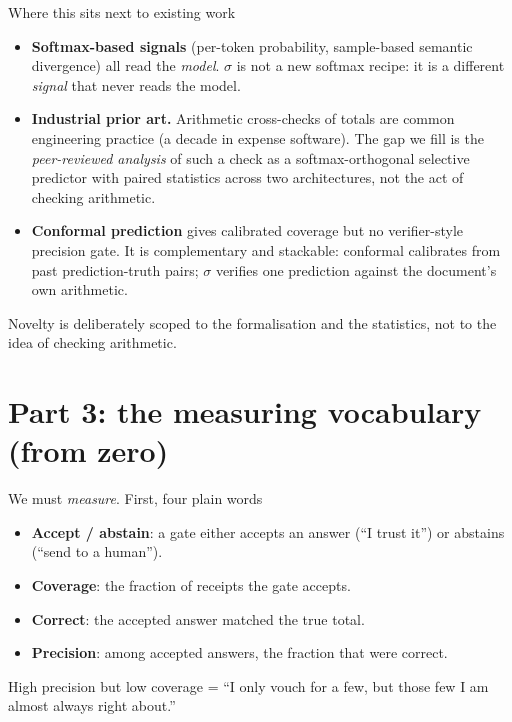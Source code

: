 \documentclass[aspectratio=169]{beamer}
\newcommand{\keybox}[1]{\begin{center}\colorbox{grey!15}{\parbox{0.92\linewidth}{\centering #1}}\end{center}}
\begin{document}
\begin{frame}{Where this sits next to existing work}
\begin{itemize}
\item \textbf{Softmax-based signals} (per-token probability,
sample-based semantic divergence) all read the \emph{model}. $\sigma$
is not a new softmax recipe: it is a different \emph{signal} that
never reads the model.
\item \textbf{Industrial prior art.} Arithmetic cross-checks of
totals are common engineering practice (a decade in expense
software). The gap we fill is the \emph{peer-reviewed analysis} of
such a check as a softmax-orthogonal selective predictor with paired
statistics across two architectures, not the act of checking
arithmetic.
\item \textbf{Conformal prediction} gives calibrated coverage but no
verifier-style precision gate. It is complementary and stackable:
conformal calibrates from past prediction-truth pairs; $\sigma$
verifies one prediction against the document's own arithmetic.
\end{itemize}
\keybox{Novelty is deliberately scoped to the formalisation and the
statistics, not to the idea of checking arithmetic.}
\end{frame}

\section{Part 3: the measuring vocabulary (from zero)}
\begin{frame}{We must \emph{measure}. First, four plain words}
\begin{itemize}
\item \textbf{Accept / abstain}: a gate either accepts an answer (``I
trust it'') or abstains (``send to a human'').
\item \textbf{Coverage}: the fraction of receipts the gate accepts.
\item \textbf{Correct}: the accepted answer matched the true total.
\item \textbf{Precision}: among accepted answers, the fraction that
were correct.
\end{itemize}
\vspace{0.8em}
\keybox{High precision but low coverage = ``I only vouch for a few,
but those few I am almost always right about.''}
\end{frame}
\end{document}
